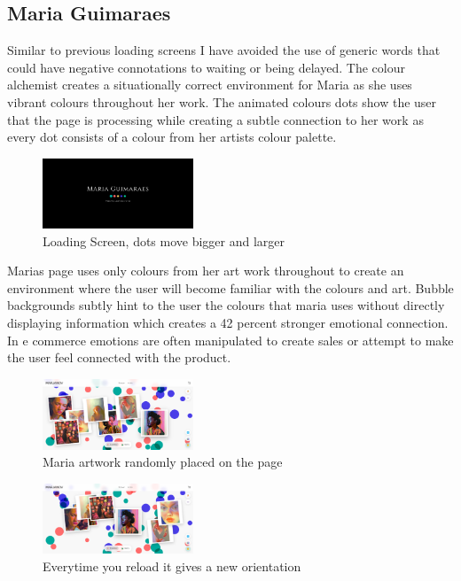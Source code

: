 \documentclass[]{project_final}
\begin{document}
\subsection{Maria Guimaraes}
Similar to previous loading screens I have avoided the use of generic words that could have negative connotations to waiting or being delayed. The colour alchemist creates a situationally correct environment for Maria as she uses vibrant colours throughout her work.
The animated colours dots show the user that the page is processing while creating a subtle connection to her work as every dot consists of a colour from her artists colour palette.

\begin{figure}[ht!]
    \centering
    \includegraphics[width=0.4\textwidth]{AG26.png}
    \vspace*{0.0cm}
    \caption{Loading Screen, dots move bigger and larger}
    \label{fig:1}
\end{figure}

Marias page uses only colours from her art work throughout to create an environment where the user will become familiar with the colours and art. Bubble backgrounds subtly hint to the user the colours that maria uses without directly displaying information which creates a 42 percent stronger emotional connection.
In e commerce emotions are often manipulated to create sales or attempt to make the user feel connected with the product.

\begin{figure}[ht!]
    \centering
    \includegraphics[width=0.4\textwidth]{AG27.png}
    \vspace*{0.0cm}
    \caption{Maria artwork randomly placed on the page}
    \label{fig:1}
\end{figure}
\begin{figure}[ht!]
    \centering
    \includegraphics[width=0.4\textwidth]{AG28.png}
    \vspace*{0.0cm}
    \caption{Everytime you reload it gives a new orientation}
    \label{fig:1}
\end{figure}
\end{document}

